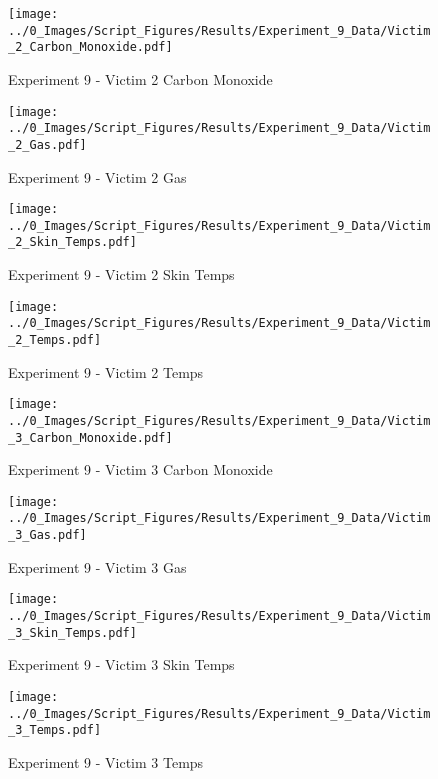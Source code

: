 	\clearpage

	\begin{figure}[H]
		\centering
		\texttt{[image: ../0\_Images/Script\_Figures/Results/Experiment\_9\_Data/Victim\_2\_Carbon\_Monoxide.pdf]}
		\caption[]{Experiment 9 - Victim 2 Carbon Monoxide}
	\end{figure}
 

	\begin{figure}[H]
		\centering
		\texttt{[image: ../0\_Images/Script\_Figures/Results/Experiment\_9\_Data/Victim\_2\_Gas.pdf]}
		\caption[]{Experiment 9 - Victim 2 Gas}
	\end{figure}
 
	\clearpage

	\begin{figure}[H]
		\centering
		\texttt{[image: ../0\_Images/Script\_Figures/Results/Experiment\_9\_Data/Victim\_2\_Skin\_Temps.pdf]}
		\caption[]{Experiment 9 - Victim 2 Skin Temps}
	\end{figure}
 

	\begin{figure}[H]
		\centering
		\texttt{[image: ../0\_Images/Script\_Figures/Results/Experiment\_9\_Data/Victim\_2\_Temps.pdf]}
		\caption[]{Experiment 9 - Victim 2 Temps}
	\end{figure}
 
	\clearpage

	\begin{figure}[H]
		\centering
		\texttt{[image: ../0\_Images/Script\_Figures/Results/Experiment\_9\_Data/Victim\_3\_Carbon\_Monoxide.pdf]}
		\caption[]{Experiment 9 - Victim 3 Carbon Monoxide}
	\end{figure}
 

	\begin{figure}[H]
		\centering
		\texttt{[image: ../0\_Images/Script\_Figures/Results/Experiment\_9\_Data/Victim\_3\_Gas.pdf]}
		\caption[]{Experiment 9 - Victim 3 Gas}
	\end{figure}
 
	\clearpage

	\begin{figure}[H]
		\centering
		\texttt{[image: ../0\_Images/Script\_Figures/Results/Experiment\_9\_Data/Victim\_3\_Skin\_Temps.pdf]}
		\caption[]{Experiment 9 - Victim 3 Skin Temps}
	\end{figure}
 

	\begin{figure}[H]
		\centering
		\texttt{[image: ../0\_Images/Script\_Figures/Results/Experiment\_9\_Data/Victim\_3\_Temps.pdf]}
		\caption[]{Experiment 9 - Victim 3 Temps}
	\end{figure}
 
